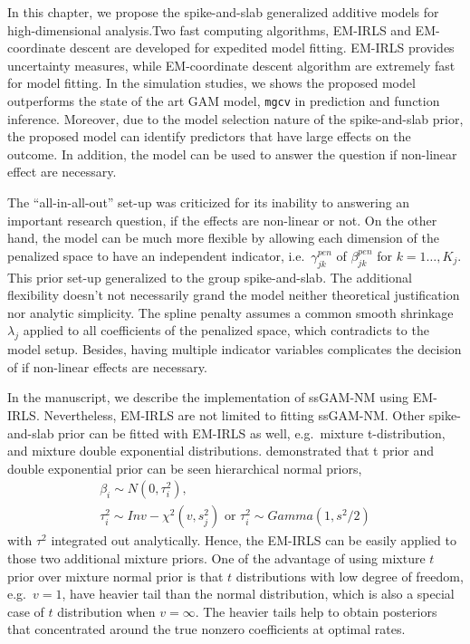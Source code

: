 \documentclass[AMA,STIX1COL,]{WileyNJD-v2}
\begin{document}
In this chapter, we propose the spike-and-slab generalized additive
models for high-dimensional analysis.Two fast computing algorithms,
EM-IRLS and EM-coordinate descent are developed for expedited model
fitting. EM-IRLS provides uncertainty measures, while EM-coordinate
descent algorithm are extremely fast for model fitting. In the
simulation studies, we shows the proposed model outperforms the state of
the art GAM model, \texttt{mgcv} in prediction and function inference.
Moreover, due to the model selection nature of the spike-and-slab prior,
the proposed model can identify predictors that have large effects on
the outcome. In addition, the model can be used to answer the question
if non-linear effect are necessary.

The ``all-in-all-out'' set-up was criticized for its inability to
answering an important research question, if the effects are non-linear
or not. On the other hand, the model can be much more flexible by
allowing each dimension of the penalized space to have an independent
indicator, i.e.~\(\gamma^{pen}_{jk}\) of \(\beta^{pen}_{jk}\) for
\(k = 1\dots, K_j\). This prior set-up generalized to the group
spike-and-slab. The additional flexibility doesn't not necessarily grand
the model neither theoretical justification nor analytic simplicity. The
spline penalty assumes a common smooth shrinkage \(\lambda_j\) applied
to all coefficients of the penalized space, which contradicts to the
model setup. Besides, having multiple indicator variables complicates
the decision of if non-linear effects are necessary.

In the manuscript, we describe the implementation of ssGAM-NM using
EM-IRLS. Nevertheless, EM-IRLS are not limited to fitting ssGAM-NM.
Other spike-and-slab prior can be fitted with EM-IRLS as well,
e.g.~mixture t-distribution, and mixture double exponential
distributions. \citet{Yi2012} demonstrated that t prior and double
exponential prior can be seen hierarchical normal priors, \[
\begin{aligned}
\beta_i \sim N(0, \tau^2_i),\\
\tau^2_i \sim Inv-\chi^2(v, s^2_j) \text{ or } \tau^2_i \sim Gamma(1, s^2/2)
\end{aligned}
\] with \(\tau^2\) integrated out analytically. Hence, the EM-IRLS can
be easily applied to those two additional mixture priors. One of the
advantage of using mixture \(t\) prior over mixture normal prior is that
\(t\) distributions with low degree of freedom, e.g.~\(v=1\), have
heavier tail than the normal distribution, which is also a special case
of \(t\) distribution when \(v=\infty\). The heavier tails help to
obtain posteriors that concentrated around the true nonzero coefficients
at optimal rates. \citep{Rockova2014a}
\end{document}
